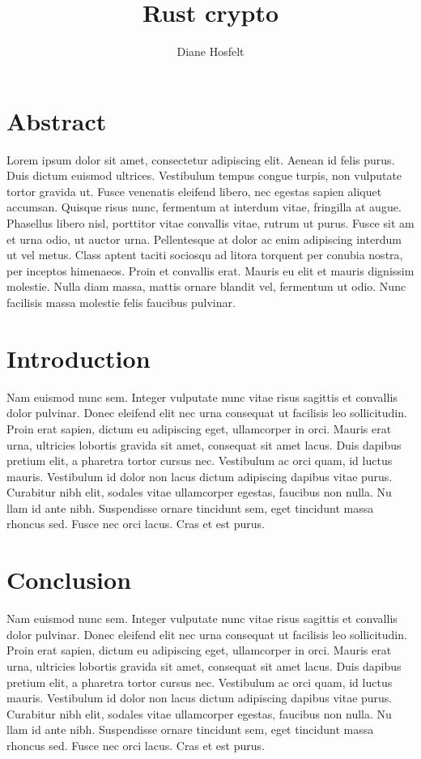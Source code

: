 \documentclass{article}
\title{Rust crypto}
\author{Diane Hosfelt}
\begin{document}
\maketitle
\begin{multicols*}{2}

\section*{Abstract}
Lorem ipsum dolor sit amet, consectetur adipiscing elit. Aenean id felis purus. Duis dictum euismod ultrices. Vestibulum tempus congue turpis, non vulputate tortor gravida ut. Fusce venenatis eleifend libero, nec egestas sapien aliquet accumsan. Quisque risus nunc, fermentum at interdum vitae, fringilla at augue. Phasellus libero nisl, porttitor vitae convallis vitae, rutrum ut purus. Fusce sit am
et urna odio, ut auctor urna. Pellentesque at dolor ac enim adipiscing interdum
ut vel metus. Class aptent taciti sociosqu ad litora torquent per conubia nostra, per inceptos himenaeos. Proin et convallis erat. Mauris eu elit et mauris dignissim molestie. Nulla diam massa, mattis ornare blandit vel, fermentum ut odio. Nunc facilisis massa molestie felis faucibus pulvinar.

\audiencesec
{}\stop

\section{Introduction}
Nam euismod nunc sem. Integer vulputate nunc vitae risus sagittis et convallis dolor pulvinar. Donec eleifend elit nec urna consequat ut facilisis leo sollicitudin. Proin erat sapien, dictum eu adipiscing eget, ullamcorper in orci. Mauris erat urna, ultricies lobortis gravida sit amet, consequat sit amet lacus. Duis dapibus pretium elit, a pharetra tortor cursus nec. Vestibulum ac orci quam, id luctus mauris. Vestibulum id dolor non lacus dictum adipiscing dapibus vitae purus. Curabitur nibh elit, sodales vitae ullamcorper egestas, faucibus non nulla. Nu
llam id ante nibh. Suspendisse ornare tincidunt sem, eget tincidunt massa rhoncus sed. Fusce nec orci lacus. Cras et est purus.

\section{Conclusion}
Nam euismod nunc sem. Integer vulputate nunc vitae risus sagittis et convallis dolor pulvinar. Donec eleifend elit nec urna consequat ut facilisis leo sollicitudin. Proin erat sapien, dictum eu adipiscing eget, ullamcorper in orci. Mauris erat urna, ultricies lobortis gravida sit amet, consequat sit amet lacus. Duis dapibus pretium elit, a pharetra tortor cursus nec. Vestibulum ac orci quam, id luctus mauris. Vestibulum id dolor non lacus dictum adipiscing dapibus vitae purus. Curabitur nibh elit, sodales vitae ullamcorper egestas, faucibus non nulla. Nu
llam id ante nibh. Suspendisse ornare tincidunt sem, eget tincidunt massa rhoncus sed. Fusce nec orci lacus. Cras et est purus.

\participation
\biosec


\end{multicols*}
\end{document}
